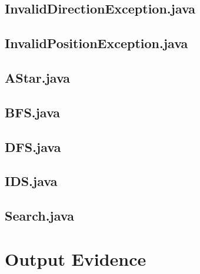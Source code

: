 \documentclass[a4paper]{article}
\begin{document}
\begin{appendices}
  \newpage
  \subsection{InvalidDirectionException.java}
  \label{app:code-InvalidDirectionException}
  

  \newpage
  \subsection{InvalidPositionException.java}
  \label{app:code-InvalidPositionException}
  

  \newpage
  \subsection{AStar.java}
  \label{app:code-AStar}
  

  \newpage
  \subsection{BFS.java}
  \label{app:code-BFS}
  

  \newpage
  \subsection{DFS.java}
  \label{app:code-DFS}
  

  \newpage
  \subsection{IDS.java}
  \label{app:code-IDS}
  

  \newpage
  \subsection{Search.java}
  \label{app:code-Search}
  

  \newpage
  \section{Output Evidence}

\end{appendices}
\end{document}
